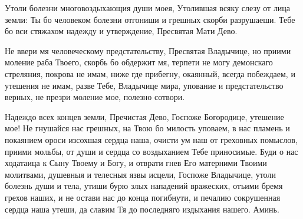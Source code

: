 \mychapterending

\begin{mymulticols}


Утоли болезни многовоздыхающия души моея, Утолившая всяку слезу от лица земли: Ты бо человеком болезни отгониши и грешных скорби разрушаеши. Тебе бо вси стяжахом надежду и утверждение, Пресвятая Мати Дево.


Не ввери мя человеческому предстательству, Пресвятая Владычице, но приими моление раба Твоего, скорбь бо обдержит мя, терпети не могу демонскаго стреляния, покрова не имам, ниже где прибегну, окаянный, всегда побеждаем, и утешения не имам, разве Тебе, Владычице мира, упование и предстательство верных, не презри моление мое, полезно сотвори.


Надеждо всех концев земли, Пречистая Дево, Госпоже Богородице, утешение мое! Не гнушайся нас грешных, на Твою бо милость уповаем, в нас пламень и покаянием ороси изсохшая сердца наша, очисти ум наш от греховных помыслов, приими мольбы, от души и сердца со воздыханием Тебе приносимые. Буди о нас ходатаица к Сыну Твоему и Богу, и отврати гнев Его матерними Твоими молитвами, душевныя и телесныя язвы исцели, Госпоже Владычице, утоли болезнь души и тела, утиши бурю злых нападений вражеских, отъими бремя грехов наших, и не остави нас до конца погибнути, и печалию сокрушенная сердца наша утеши, да славим Тя до последняго издыхания нашего. Аминь.

\end{mymulticols}

\mychapterending

